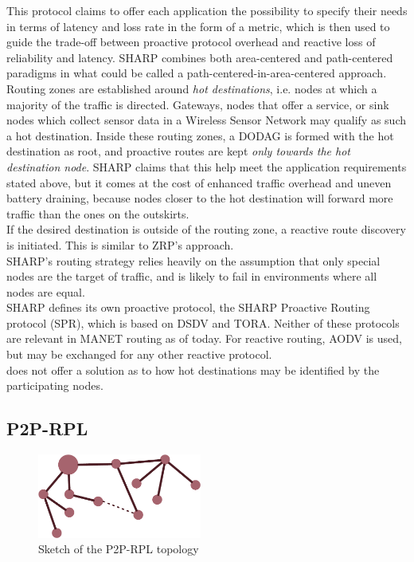 \documentclass[a4paper,10pt]{scrartcl}
\begin{document}
This protocol claims to offer each application the possibility to specify their needs in terms of latency and loss rate in the form of a metric, which is then used to guide the trade-off between proactive protocol overhead and reactive loss of reliability and latency.
SHARP combines both area-centered and path-centered paradigms in what could be called a path-centered-in-area-centered approach. Routing zones are established around \emph{hot destinations}, i.e. nodes at which a majority of the traffic is directed. Gateways, nodes that offer a service, or sink nodes which collect sensor data in a Wireless Sensor Network may qualify as such a hot destination. Inside these routing zones, a \gls{DODAG} is formed with the hot destination as root, and proactive routes are kept \emph{only towards the hot destination node}. SHARP claims that this help meet the application requirements stated above, but it comes at the cost of enhanced traffic overhead and uneven battery draining, because nodes closer to the hot destination will forward more traffic than the ones on the outskirts.\\
If the desired destination is outside of the routing zone, a reactive route discovery is initiated. This is similar to ZRP's approach.\\
SHARP's routing strategy relies heavily on the assumption that only special nodes are the target of traffic, and is likely to fail in environments where all nodes are equal.\\
SHARP defines its own proactive protocol, the SHARP Proactive Routing protocol (SPR), which is based on DSDV\cite{DSDV} and TORA\cite{TORA}. Neither of these protocols are relevant in MANET routing as of today.
For reactive routing, AODV is used, but may be exchanged for any other reactive protocol.\\
\cite{SHARP} does not offer a solution as to how hot destinations may be identified by the participating nodes.

\subsection{P2P-RPL}
\label{subsec:p2prpl}
\begin{figure}
  \begin{center}
    \includegraphics[width=0.48\textwidth]{../images/p2pRPL}
  \end{center}
  \label{fig:p2p}
  \caption{Sketch of the P2P-RPL topology}
\end{figure}
\end{document}
